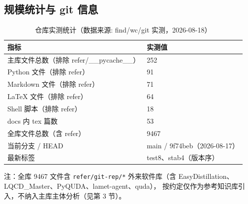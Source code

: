\documentclass[UTF8]{ctexart}
\begin{document}
\subsection{规模统计与 git 信息}
\begin{table}[htbp]\centering
\begin{tabular}{ll}
\toprule
指标 & 实测值 \\
\midrule
主库文件总数（排除 refer/\_\_pycache\_\_） & 252 \\
Python 文件（排除 refer） & 91 \\
Markdown 文件（排除 refer） & 71 \\
LaTeX 文件（排除 refer） & 64 \\
Shell 脚本（排除 refer） & 18 \\
docs 内 tex 篇数 & 53 \\
全库文件总数（含 refer） & 9467 \\
当前分支 / HEAD & main / 9f74beb（2026-08-17） \\
最新标签 & test8、stab4（版本序） \\
\bottomrule
\end{tabular}
\caption{仓库实测统计（数据来源: find/wc/git 实测，2026-08-18）}
\end{table}
注：全库 9467 文件含 \texttt{refer/git-rep/*} 外来软件库（含 EasyDistillation、LQCD\_Master、PyQUDA、lamet-agent、quda），
按约定仅作为参考知识库引入，不纳入主库主体分析（见第 3 节）。

\end{document}
